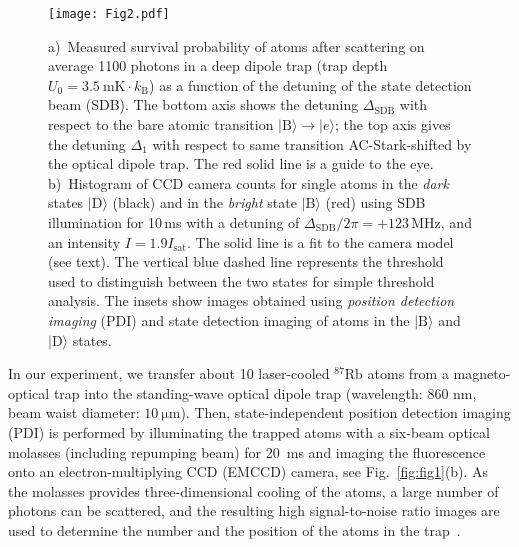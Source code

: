 \documentclass[aps,prl,twocolumn,english,showpacs]{revtex4-1}
\begin{document}
\begin{figure}[t]
\centering
    \texttt{[image: Fig2.pdf]}
\caption[Setup] {a)~Measured survival probability of atoms after scattering on average 1100 photons in a deep dipole trap (trap depth $U_0 =  \SI{3.5}{\milli\kelvin} \cdot k_\text{B}$) as a function of the detuning of the state detection beam (SDB). The bottom axis shows the detuning $\Delta_\text{SDB}$ with respect to the bare atomic transition $\vert \text{B}\rangle \rightarrow \vert e \rangle$; the top axis gives the detuning $\Delta_1$ with respect to same transition AC-Stark-shifted by the optical dipole trap. The red solid line is a guide to the eye. b)~Histogram of CCD camera counts for single atoms in the \emph{dark} states $\vert \text{D} \rangle$ (black) and  in the \emph{bright} state $\vert \text{B} \rangle$ (red) using SDB illumination for 10\,ms with a detuning of $\Delta_\text{SDB}/2\pi= +123$\,MHz, and an intensity $I = 1.9 I_\text{sat}$. The solid line is a fit to the camera model (see text). The vertical blue dashed line represents the threshold used to distinguish between the two states for simple threshold analysis. The insets show images obtained using \emph{position detection imaging} (PDI) and state detection imaging of atoms in the $\vert \text{B} \rangle$ and $\vert \text{D} \rangle$ states.
} {\label{fig:fig2}}
\end{figure}

In our experiment, we transfer about 10 laser-cooled $^{87}$Rb atoms from a magneto-optical trap into the standing-wave optical dipole trap (wavelength: 860 nm, beam waist diameter: $\SI{10}{\micro\meter}$). Then, state-independent position detection imaging (PDI) is performed by illuminating the trapped atoms with a six-beam optical molasses (including repumping beam) for \SI{20}{\milli\second} and imaging the fluorescence onto an electron-multiplying CCD (EMCCD) camera, see Fig.~\ref{fig:fig1}(b). As the molasses provides three-dimensional cooling of the atoms, a large number of photons can be scattered, and the resulting high signal-to-noise ratio images are used to determine the number and the position of the atoms in the trap~\cite{Alberti2016SuperResolution}.
\end{document}
